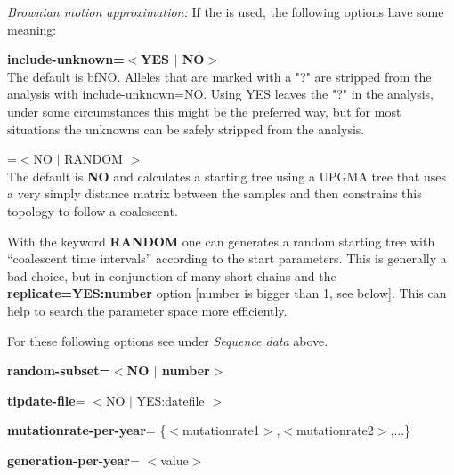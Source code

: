\textsl{Brownian motion approximation:}
If the {} is used, the following options have some meaning:\begin{description}
\item{\bf{ include-unknown=$<$YES $|$ NO$>$}}\\ The default is {bf{NO}}. Alleles that are marked with a "?" are stripped from the analysis  with include-unknown=NO. Using YES leaves the "?" in the analysis, under some circumstances this might be the preferred way, but for most situations the unknowns can be safely stripped from the analysis.
\item{=$<$NO $|$  RANDOM $>$}\\
The default is \textbf{NO} and \migrate calculates a starting tree using a UPGMA tree that uses a very simply distance matrix between the samples and then constrains this topology to follow a coalescent. 

 With the keyword \textbf{RANDOM} one can generates a random starting tree with ``coalescent time intervals''  according to the start parameters. This is generally a bad choice,  but in conjunction of many short chains and the {\bf replicate=YES:number} 
option [number is bigger than 1, see below]. This can help to search the 
parameter space more efficiently.
\end{description}

For these following options see under \textsl{Sequence data} above.
\begin{description}
\item {\bf random-subset=$<$NO $|$ number$>$}
\item{\bf tipdate-file}= $<$NO $|$ YES:datefile $>$ 
\item{\bf mutationrate-per-year}= \{$<$mutationrate1$>$,$<$mutationrate2$>$,...\} 
\item{\bf generation-per-year}= $<$value$>$ 
\end{description}

